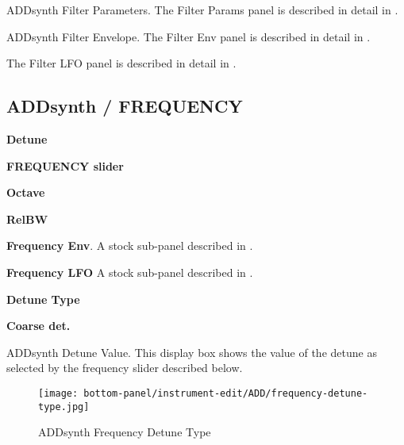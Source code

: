    \setcounter{ItemCounter}{0}      %

   ADDsynth Filter Parameters.
   The Filter Params panel is described in detail in
   .

   ADDsynth Filter Envelope.
   The Filter Env panel is described in detail in
   .

   The Filter LFO panel is described in detail in
   .

\subsection{ADDsynth / FREQUENCY}
\label{subsec:addsynth_frequency}

   \begin{enumber}
      \item \textbf{Detune}
      \item \textbf{FREQUENCY slider}
      \item \textbf{Octave}
      \item \textbf{RelBW}
      \item \textbf{Frequency Env}.
         A stock sub-panel described in
         .
      \item \textbf{Frequency LFO}
         A stock sub-panel described in
         .
      \item \textbf{Detune Type}
      \item \textbf{Coarse det.}
   \end{enumber}

   \setcounter{ItemCounter}{0}      %

   ADDsynth Detune Value.
   This display box shows the value of the detune as selected by the
   frequency slider described below.

\begin{figure}[H]
   \centering 
   \texttt{[image: bottom-panel/instrument-edit/ADD/frequency-detune-type.jpg]}
   \caption{ADDsynth Frequency Detune Type}
   \label{fig:addsynth_freq_detune_type}
\end{figure}

